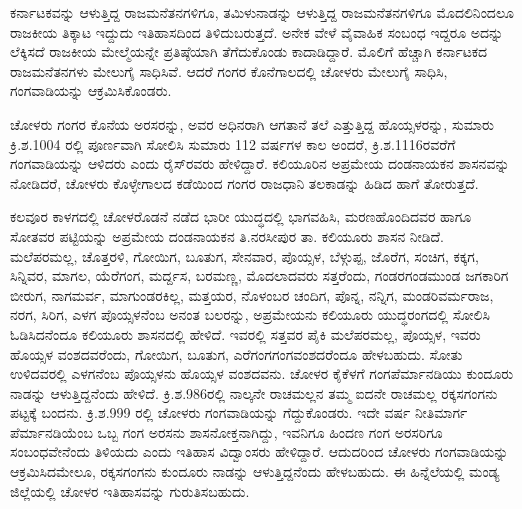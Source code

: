 ಕರ್ನಾಟಕವನ್ನು ಆಳುತ್ತಿದ್ದ ರಾಜಮನೆತನಗಳಿಗೂ, ತಮಿಳುನಾಡನ್ನು ಆಳುತ್ತಿದ್ದ ರಾಜಮನೆತನಗಳಿಗೂ ಮೊದಲಿನಿಂದಲೂ ರಾಜಕೀಯ ತಿಕ್ಕಾಟ ಇದ್ದುದು ಇತಿಹಾಸದಿಂದ ತಿಳಿದುಬರುತ್ತದೆ. ಅನೇಕ ವೇಳೆ ವೈವಾಹಿಕ ಸಂಬಂಧ ಇದ್ದರೂ ಅದನ್ನು ಲೆಕ್ಕಿಸದೆ ರಾಜಕೀಯ ಮೇಲ್ಮೆಯನ್ನೇ ಪ್ರತಿಷ್ಠೆಯಾಗಿ ತೆಗೆದುಕೊಂಡು ಕಾದಾಡಿದ್ದಾರೆ. ಮೊಲಿಗೆ ಹೆಚ್ಚಾಗಿ ಕರ್ನಾಟಕದ ರಾಜಮನೆತನಗಳು ಮೇಲುಗೈ ಸಾಧಿಸಿವೆ. ಆದರೆ ಗಂಗರ ಕೊನೆಗಾಲದಲ್ಲಿ ಚೋಳರು ಮೇಲುಗೈ ಸಾಧಿಸಿ, ಗಂಗವಾಡಿಯನ್ನು ಆಕ್ರಮಿಸಿಕೊಂಡರು.

ಚೋಳರು ಗಂಗರ ಕೊನೆಯ ಅರಸರನ್ನು, ಅವರ ಅಧಿನರಾಗಿ ಆಗತಾನೆ ತಲೆ ಎತ್ತುತ್ತಿದ್ದ ಹೊಯ್ಸಳರನ್ನು, ಸುಮಾರು ಕ್ರಿ.ಶ.1004 ರಲ್ಲಿ ಪೂರ್ಣವಾಗಿ ಸೋಲಿಸಿ ಸುಮಾರು 112 ವರ್ಷಗಳ ಕಾಲ ಅಂದರೆ, ಕ್ರಿ.ಶ.1116ರವರೆಗೆ ಗಂಗವಾಡಿಯನ್ನು ಆಳಿದರು ಎಂದು ರೈಸ್​ರವರು ಹೇಳಿದ್ದಾರೆ. ಕಲಿಯೂರಿನ ಅಪ್ರಮೇಯ ದಂಡನಾಯಕನ ಶಾಸನವನ್ನು ನೋಡಿದರೆ, ಚೋಳರು ಕೊಳ್ಳೇಗಾಲದ ಕಡೆಯಿಂದ ಗಂಗರ ರಾಜಧಾನಿ ತಲಕಾಡನ್ನು ಹಿಡಿದ ಹಾಗೆ ತೋರುತ್ತದೆ.

ಕಲವೂರ ಕಾಳಗದಲ್ಲಿ ಚೋಳರೊಡನೆ ನಡೆದ ಭಾರೀ ಯುದ್ಧದಲ್ಲಿ ಭಾಗವಹಿಸಿ, ಮರಣಹೊಂದಿದವರ ಹಾಗೂ ಸೋತವರ ಪಟ್ಟಿಯನ್ನು ಅಪ್ರಮೇಯ ದಂಡನಾಯಕನ ತಿ.ನರಸೀಪುರ ತಾ. ಕಲಿಯೂರು ಶಾಸನ ನೀಡಿದೆ. ಮಲೆಪರಮಲ್ಲ, ಚೊತ್ತರಳಿ, ಗೋಯಿಗ, ಬೂತುಗ, ಸೇನವಾರ, ಪೊಯ್ಸಳ, ಬೆಳ್ಗುಪ್ಪ, ಜೊರೆಗ, ಸಂಚಿಗ, ಕಕ್ಕಗ, ಸಿನ್ನಿವರ, ಮಾಗಲ, ಯೆರೆಗಂಗ, ಮರ್ದ್ದಸ, ಬರಮಣ್ಣ, ಮೊದಲಾದವರು ಸತ್ತರೆಂದು, ಗಂಡರಗಂಡಮುಂಡ ಜಗಕಾರಿಗ ಬೀರುಗ, ನಾಗಮರ್ವ, ಮಾಗುಂಡರಕಿಲ್ಲ, ಮತ್ತಯರ, ನೊಳಂಬರ ಚಂದಿಗ, ಪೊನ್ನ, ನನ್ನಿಗ, ಮಂಡರಿವರ್ಮರಾಜ, ನರಗ, ಸಿರಿಗ, ಎಳಗ ಪೊಯ್ಸಳನೆಂಬ ಅನಂತ ಬಲರನ್ನು, ಅಪ್ರಮೇಯನು ಕಲಿಯೂರು ಯುದ್ಧರಂಗದಲ್ಲಿ ಸೋಲಿಸಿ ಓಡಿಸಿದನೆಂದೂ ಕಲಿಯೂರು ಶಾಸನದಲ್ಲಿ ಹೇಳಿದೆ. ಇವರಲ್ಲಿ ಸತ್ತವರ ಪೈಕಿ ಮಲೆಪರಮಲ್ಲ, ಪೊಯ್ಸಳ, ಇವರು ಹೊಯ್ಸಳ ವಂಶದವರೆಂದು, ಗೋಯಿಗ, ಬೂತುಗ, ಎರೆಗಂಗ\break ಗಂಗವಂಶದರೆಂದೂ ಹೇಳಬಹುದು. ಸೋತು ಉಳಿದವರಲ್ಲಿ ಎಳಗನೆಂಬ ಪೊಯ್ಸಳನು ಹೊಯ್ಸಳ ವಂಶದವನು. ಚೋಳರ ಕೈಕೆಳಗೆ ಗಂಗಪೆರ್ಮಾನಡಿಯು ಕುಂದೂರು ನಾಡನ್ನು ಆಳುತ್ತಿದ್ದನೆಂದು ಹೇಳಿದೆ. ಕ್ರಿ.ಶ.986ರಲ್ಲಿ ನಾಲ್ಕನೇ ರಾಚಮಲ್ಲನ ತಮ್ಮ ಐದನೇ ರಾಚಮಲ್ಲ ರಕ್ಕಸಗಂಗನು ಪಟ್ಟಕ್ಕೆ ಬಂದನು. ಕ್ರಿ.ಶ.999 ರಲ್ಲಿ ಚೋಳರು ಗಂಗವಾಡಿಯನ್ನು ಗೆದ್ದುಕೊಂಡರು. ಇದೇ ವರ್ಷ ನೀತಿಮಾರ್ಗ ಪೆರ್ಮಾನಡಿಯೆಂಬ ಒಬ್ಬ ಗಂಗ ಅರಸನು ಶಾಸನೋಕ್ತನಾಗಿದ್ದು, ಇವನಿಗೂ ಹಿಂದಣ ಗಂಗ ಅರಸರಿಗೂ ಸಂಬಂಧವೇನೆಂದು ತಿಳಿಯದು ಎಂದು ಇತಿಹಾಸ ವಿದ್ವಾಂಸರು ಹೇಳಿದ್ದಾರೆ. ಆದುದರಿಂದ ಚೋಳರು ಗಂಗವಾಡಿಯನ್ನು ಆಕ್ರಮಿಸಿದಮೇಲೂ, ರಕ್ಕಸಗಂಗನು ಕುಂದೂರು ನಾಡನ್ನು ಆಳುತ್ತಿದ್ದನೆಂದು ಹೇಳಬಹುದು. ಈ ಹಿನ್ನೆಲೆಯಲ್ಲಿ ಮಂಡ್ಯ ಜಿಲ್ಲೆಯಲ್ಲಿ ಚೋಳರ ಇತಿಹಾಸವನ್ನು ಗುರುತಿಸಬಹುದು.

